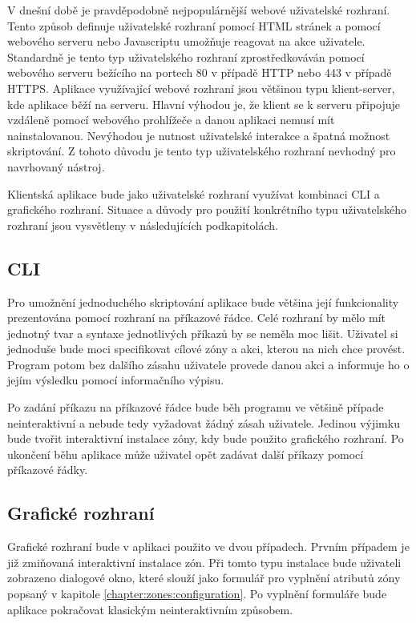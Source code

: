 V dnešní době je pravděpodobně nejpopulárnější webové uživatelské rozhraní. Tento způsob definuje uživatelské rozhraní pomocí
HTML stránek a pomocí webového serveru nebo Javascriptu umožňuje reagovat na akce uživatele. Standardně je tento typ uživatelského
rozhraní zprostředkováván pomocí webového serveru bežícího na portech 80 v případě HTTP nebo 443 v případě HTTPS. Aplikace
využívající webové rozhraní jsou většinou typu klient-server, kde aplikace běží na serveru. Hlavní výhodou je, že klient se
k serveru připojuje vzdáleně pomocí webového prohlížeče a danou aplikaci nemusí mít nainstalovanou. Nevýhodou je nutnost
uživatelské interakce a špatná možnost skriptování. Z tohoto důvodu je tento typ uživatelského rozhraní nevhodný pro navrhovaný
nástroj.

Klientská aplikace bude jako uživatelské rozhraní využívat kombinaci CLI a grafického rozhraní. Situace a důvody pro použití
konkrétního typu uživatelského rozhraní jsou vysvětleny v následujících podkapitolách.
\subsection{CLI}
\label{chapter:design:ui:cli}
Pro umožnění jednoduchého skriptování aplikace bude většina její funkcionality prezentována pomocí rozhraní na příkazové
řádce. Celé rozhraní by mělo mít jednotný tvar a syntaxe jednotlivých příkazů by se neměla moc lišit. Uživatel si jednoduše
bude moci specifikovat cílové zóny a akci, kterou na nich chce provést. Program potom bez dalšího zásahu uživatele provede
danou akci a informuje ho o jejím výsledku pomocí informačního výpisu.

Po zadání příkazu na příkazové řádce bude běh programu ve většině případe neinteraktivní a nebude tedy vyžadovat žádný 
zásah uživatele. Jedinou výjimku bude tvořit interaktivní instalace zóny, kdy bude použito grafického rozhraní. Po ukončení
běhu aplikace může uživatel opět zadávat další příkazy pomocí příkazové řádky.
\subsection{Grafické rozhraní}
\label{chapter:design:ui:gui}
Grafické rozhraní bude v aplikaci použito ve dvou případech. Prvním případem je již zmiňovaná interaktivní instalace zón. Při
tomto typu instalace bude uživateli zobrazeno dialogové okno, které slouží jako formulář pro vyplnění atributů zóny popsaný v
kapitole \ref{chapter:zones:configuration}. Po vyplnění formuláře bude aplikace pokračovat klasickým neinteraktivním způsobem.

